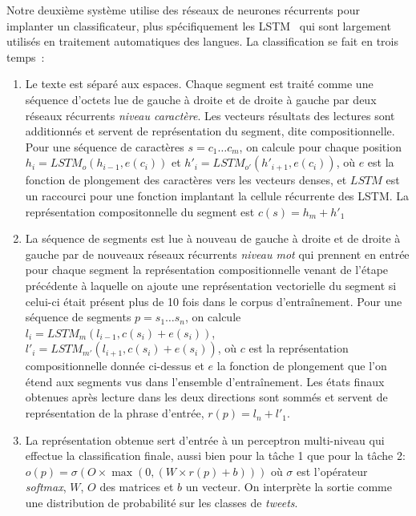 Notre deuxième système utilise des réseaux de neurones récurrents pour implanter un classificateur, plus spécifiquement les LSTM~\cite{hochreiter1997long} qui sont largement utilisés en traitement automatiques des langues.
La classification se fait en trois temps~:
\begin{enumerate}
\item Le texte est séparé aux espaces.
  Chaque segment est traité comme une séquence d'octets lue de gauche à droite et de droite à gauche par deux réseaux récurrents \emph{niveau caractère}.
  Les vecteurs résultats des lectures sont additionnés et servent de représentation du segment, dite compositionnelle.
  Pour une séquence de caractères $s = c_{1}\ldots c_{m}$, on calcule pour chaque position $h_{i} = LSTM_{o}(h_{i-1},e(c_{i}))$ et $h'_{i} = LSTM_{o'}(h'_{i+1},e(c_{i}))$, où $e$ est la fonction de plongement des caractères vers les vecteurs denses, et $LSTM$ est un raccourci pour une fonction  implantant la cellule récurrente des {LSTM}.
  La représentation compositonnelle du segment est $c(s) = h_{m} + h'_{1}$

\item La séquence de segments est lue à nouveau de gauche à droite et de droite à gauche par de nouveaux réseaux récurrents \emph{niveau mot} qui prennent en entrée pour chaque segment la représentation compositionnelle venant de l'étape précédente à laquelle on ajoute une représentation vectorielle du segment si celui-ci était présent  plus de 10 fois dans le corpus d'entraînement.
  Pour une séquence de segments $p = s_{1} \ldots s_{n}$, on calcule
  $l_{i} = LSTM_{m}(l_{i-1},c(s_{i}) + e(s_{i}))$, $l'_{i} =
  LSTM_{m'}(l_{i+1},c(s_{i}) + e(s_{i}))$, où $c$ est la représentation compositionnelle donnée ci-dessus et $e$ la fonction de plongement que l'on étend aux segments vus dans l'ensemble d'entraînement.
  Les états finaux obtenues après lecture dans les deux directions sont sommés et servent de représentation de la phrase d'entrée, $r(p) = l_{n} + l'_{1}$.

\item La représentation obtenue sert d'entrée à un perceptron multi-niveau qui effectue la classification finale, aussi bien pour la tâche 1 que pour la tâche 2:  $o(p) = \sigma(O \times \max(0, (W \times r(p) + b)))$ où $\sigma$ est l'opérateur \emph{softmax}, $W$, $O$ des matrices et $b$ un vecteur. On interprète la sortie comme une distribution de probabilité sur les classes de \textit{tweets}.
\end{enumerate}

